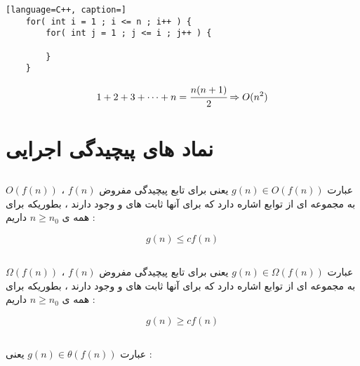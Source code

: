 \documentclass[12pt]{book}
\begin{document}
\begin{latin}
    \begin{lstlisting}[language=C++, caption=]
	for( int i = 1 ; i <= n ; i++ ) {
		for( int j = 1 ; j <= i ; j++ ) {
		
		}
	}	
	\end{lstlisting}
\end{latin}



\begin{tcolorbox}
\begin{align*}
    1 + 2 + 3 + \dots + n = \cfrac{n(n+1)}{2} \Rightarrow O(n^{2})
	\end{align*}
\end{tcolorbox}




\section{نماد های پیچیدگی اجرایی}



\subsection{}

عبارت
$g(n) \in O(f(n))$
یعنی برای تابع پیچیدگی مفروض 
$f(n)$
،
$O(f(n))$
به مجموعه ای از توابع اشاره دارد که برای آنها ثابت های 
و
وجود دارند ، بطوریکه برای همه ی 
$n \geq n_{0}$
داریم :

$$
g(n) \leq cf(n)
$$


\subsection{}

عبارت
$g(n) \in \Omega(f(n))$
یعنی برای تابع پیچیدگی مفروض 
$f(n)$
،
$\Omega(f(n))$
به مجموعه ای از توابع اشاره دارد که برای آنها ثابت های 
و
وجود دارند ، بطوریکه برای همه ی 
$n \geq n_{0}$
داریم :

$$
g(n) \geq cf(n)
$$



\subsection{}



عبارت
$g(n) \in \theta(f(n))$
یعنی :
\end{document}
